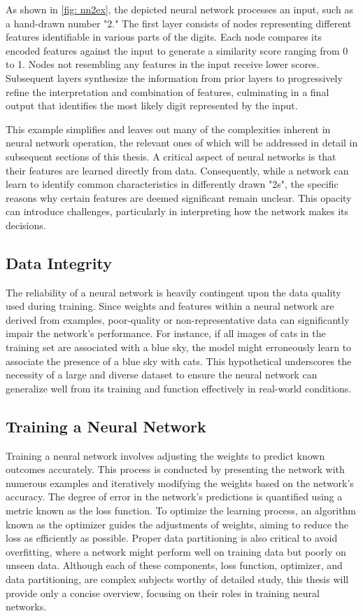 As shown in \autoref{fig: nn2ex}, the depicted neural network processes an input, such as a hand-drawn number "2." The first layer consists of nodes representing different features identifiable in various parts of the digits. Each node compares its encoded features against the input to generate a similarity score ranging from 0 to 1. Nodes not resembling any features in the input receive lower scores. Subsequent layers synthesize the information from prior layers to progressively refine the interpretation and combination of features, culminating in a final output that identifies the most likely digit represented by the input.

This example simplifies and leaves out many of the complexities inherent in neural network operation, the relevant ones of which will be addressed in detail in subsequent sections of this thesis. A critical aspect of neural networks is that their features are learned directly from data. Consequently, while a network can learn to identify common characteristics in differently drawn "2s", the specific reasons why certain features are deemed significant remain unclear. This opacity can introduce challenges, particularly in interpreting how the network makes its decisions\cite{Mohammed2016}.

\subsection{Data Integrity}
The reliability of a neural network is heavily contingent upon the data quality used during training\cite{Sarker2021}. Since weights and features within a neural network are derived from examples, poor-quality or non-representative data can significantly impair the network's performance. For instance, if all images of cats in the training set are associated with a blue sky, the model might erroneously learn to associate the presence of a blue sky with cats. This hypothetical underscores the necessity of a large and diverse dataset to ensure the neural network can generalize well from its training and function effectively in real-world conditions.

\subsection{Training a Neural Network}
Training a neural network involves adjusting the weights to predict known outcomes accurately. This process is conducted by presenting the network with numerous examples and iteratively modifying the weights based on the network's accuracy. The degree of error in the network's predictions is quantified using a metric known as the loss function. To optimize the learning process, an algorithm known as the optimizer guides the adjustments of weights, aiming to reduce the loss as efficiently as possible. Proper data partitioning is also critical to avoid overfitting, where a network might perform well on training data but poorly on unseen data. Although each of these components, loss function, optimizer, and data partitioning, are complex subjects worthy of detailed study, this thesis will provide only a concise overview, focusing on their roles in training neural networks.

